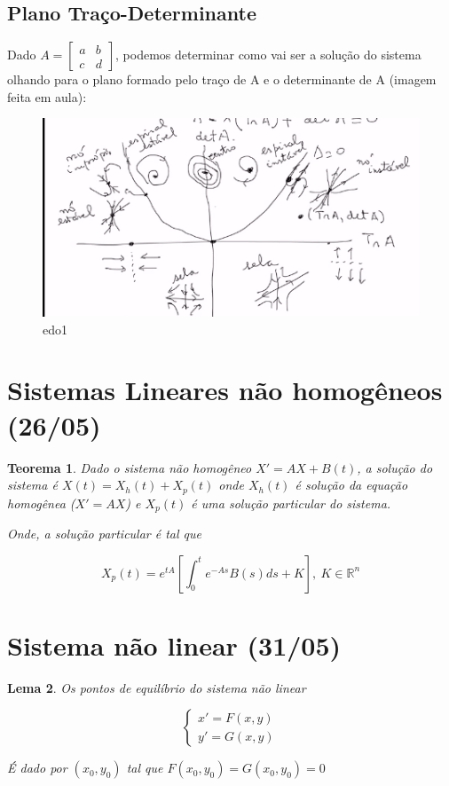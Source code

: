 \documentclass{article}
\newtheorem{theorem}{Teorema}[section]
\newtheorem{lemma}[theorem]{Lema}
\begin{document}
\subsection*{Plano Traço-Determinante}
Dado $A = \left [ \begin{array}{cc}
    a & b \\
    c & d
\end{array} \right ]$, podemos determinar como vai ser a solução do sistema olhando para o plano formado pelo traço de A e o determinante de A (imagem feita em aula):

\begin{figure}[h]
    \centering
    \includegraphics{edo1.png}
    \caption{edo1}
    \label{fig:my_label}
\end{figure}


\section*{Sistemas Lineares não homogêneos (26/05)}
\label{s19}
\begin{theorem}
    Dado o sistema não homogêneo $X' = AX + B(t)$, a solução do sistema é $X(t) = X_h(t) + X_p(t)$ onde $X_h(t)$ é solução da equação homogênea ($X' = A X$) e $X_p(t)$ é uma solução particular do sistema.
    
    Onde, a solução particular é tal que
    
    $$X_p(t) = e^{t A} \left [ \int_0^t e^{- A s} B(s) d s + K \right ], \ K \in \mathbb{R}^n$$
\end{theorem}

\section*{Sistema não linear (31/05)}
\label{s20}
\begin{lemma}
    Os pontos de equilíbrio do sistema não linear
    
    $$ \left \{
    \begin{array}{ll}
        x' = F(x, y) \\
        y' = G(x, y)
    \end{array} \right .
    $$
    
    É dado por $(x_0, y_0)$ tal que $F(x_0, y_0) = G(x_0, y_0) = 0$ 
\end{lemma}
\end{document}
